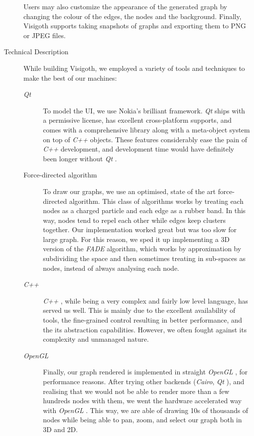 \documentclass[a4paper,11pt]{article}
\newcommand{\buzz}[1]{\emph{#1}}
\newcommand{\Qt}{\buzz{Qt} }
\newcommand{\Cpp}{\buzz{C++} }
\newcommand{\OpenGL}{\buzz{OpenGL} }
\newcommand{\FADE}{\buzz{FADE} }
\begin{document}
\begin{description}
  Users may also customize the appearance of the generated graph by
  changing the colour of the edges, the nodes and the background.
  Finally, Visigoth supports taking snapshots of graphs and exporting
  them to PNG or JPEG files.

\item[Technical Description]

  While building Visigoth, we employed a variety of tools and techniques to make
  the best of our machines:

  \begin{description}
    \item[\Qt] To model the UI, we use Nokia's brilliant framework. \Qt
      ships with a permissive license, has excellent cross-platform supports,
      and comes with a comprehensive library along with a meta-object system on
      top of \Cpp objects. These features considerably ease the pain of \Cpp
      development, and development time would have definitely been longer
      without \Qt.

    \item[Force-directed algorithm] To draw our graphs, we use an optimised,
      state of the art force-directed algorithm. This class of algorithms works
      by treating each nodes as a charged particle and each edge as a rubber
      band. In this way, nodes tend to repel each other while edges keep
      clusters together. Our implementation worked great but was too slow for
      large graph. For this reason, we sped it up implementing a 3D version of
      the \FADE algorithm, which works by approximation by subdividing the space
      and then sometimes treating in sub-spaces as nodes, instead of always
      analysing each node.

    \item[\Cpp] \Cpp, while being a very complex and fairly low level language,
      has served us well. This is mainly due to the excellent availability of
      tools, the fine-grained control resulting in better performance, and the
      its abstraction capabilities. However, we often fought against its
      complexity and unmanaged nature.

    \item[\OpenGL] Finally, our graph rendered is implemented in straight
      \OpenGL, for performance reasons. After trying other backends
      (\buzz{Cairo}, \Qt), and realising that we would not be able to render
      more than a few hundreds nodes with them, we went the hardware accelerated
      way with \OpenGL. This way, we are able of drawing 10s of thousands of
      nodes while being able to pan, zoom, and select our graph both in 3D and
      2D.
  \end{description}


\end{description}
\end{document}
